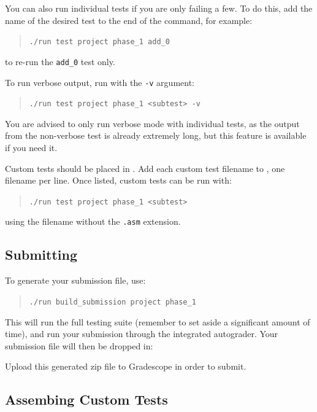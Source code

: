 \documentclass[12pt]{article}
\begin{document}
You can also run individual tests if you are only failing a few. To do this, add the name of the desired test to the end of the command, for example:
\begin{quote}
\texttt{./run test project phase\_1 add\_0}
\end{quote}
to re-run the \texttt{add\_0} test only.

To run verbose output, run with the \texttt{-v} argument:
\begin{quote}
\texttt{./run test project phase\_1 <subtest> -v}
\end{quote}
You are advised to only run verbose mode with individual tests, as the output from the non-verbose test is already extremely long, but this feature is available if you need it.

Custom tests should be placed in . Add each custom test filename to , one filename per line. Once listed, custom tests can be run with:
\begin{quote}
\texttt{./run test project phase\_1 <subtest>}
\end{quote}
using the filename without the \texttt{.asm} extension.

\subsection*{Submitting}
To generate your submission file, use:
\begin{quote}
\texttt{./run build\_submission project phase\_1}
\end{quote}
This will run the full testing suite (remember to set aside a significant amount of time), and run your submission through the integrated autograder. Your submission file will then be dropped in:
\begin{quote}
\end{quote}
Upload this generated zip file to Gradescope in order to submit.

\subsection*{Assembing Custom Tests}
\end{document}
